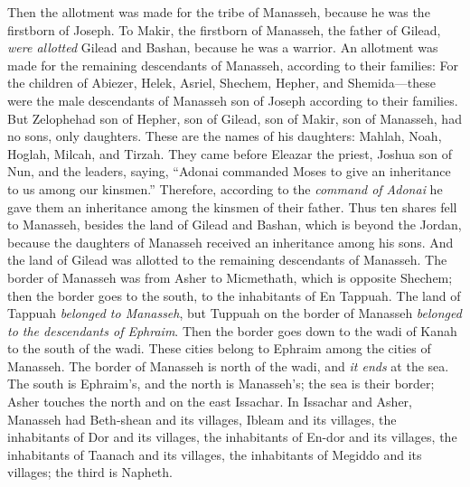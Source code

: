 \begin{biblechapter} %
 Then the allotment was made for the tribe of Manasseh, because he was the firstborn of Joseph. To Makir, the firstborn of Manasseh, the father of Gilead, \textit{were allotted} Gilead and Bashan, because he was a warrior.
\verse An allotment was made for the remaining descendants of Manasseh, according to their families: For the children of Abiezer, Helek, Asriel, Shechem, Hepher, and Shemida—these were the male descendants of Manasseh son of Joseph according to their families.
\verse But Zelophehad son of Hepher, son of Gilead, son of Makir, son of Manasseh, had no sons, only daughters. These are the names of his daughters: Mahlah, Noah, Hoglah, Milcah, and Tirzah.
\verse They came before Eleazar the priest, Joshua son of Nun, and the leaders, saying, “Adonai commanded Moses to give an inheritance to us among our kinsmen.” Therefore, according to the \textit{command of Adonai} he gave them an inheritance among the kinsmen of their father.
\verse Thus ten shares fell to Manasseh, besides the land of Gilead and Bashan, which is beyond the Jordan,
\verse because the daughters of Manasseh received an inheritance among his sons. And the land of Gilead was allotted to the remaining descendants of Manasseh.
\verse The border of Manasseh was from Asher to Micmethath, which is opposite Shechem; then the border goes to the south, to the inhabitants of En Tappuah.
\verse The land of Tappuah \textit{belonged to Manasseh}, but Tuppuah on the border of Manasseh \textit{belonged to the descendants of Ephraim}.
\verse Then the border goes down to the wadi of Kanah to the south of the wadi. These cities belong to Ephraim among the cities of Manasseh. The border of Manasseh is north of the wadi, and \textit{it ends} at the sea.
\verse The south is Ephraim’s, and the north is Manasseh’s; the sea is their border; Asher touches the north and on the east Issachar.
\verse In Issachar and Asher, Manasseh had Beth-shean and its villages, Ibleam and its villages, the inhabitants of Dor and its villages, the inhabitants of En-dor and its villages, the inhabitants of Taanach and its villages, the inhabitants of Megiddo and its villages; the third is Napheth.

\end{biblechapter}
